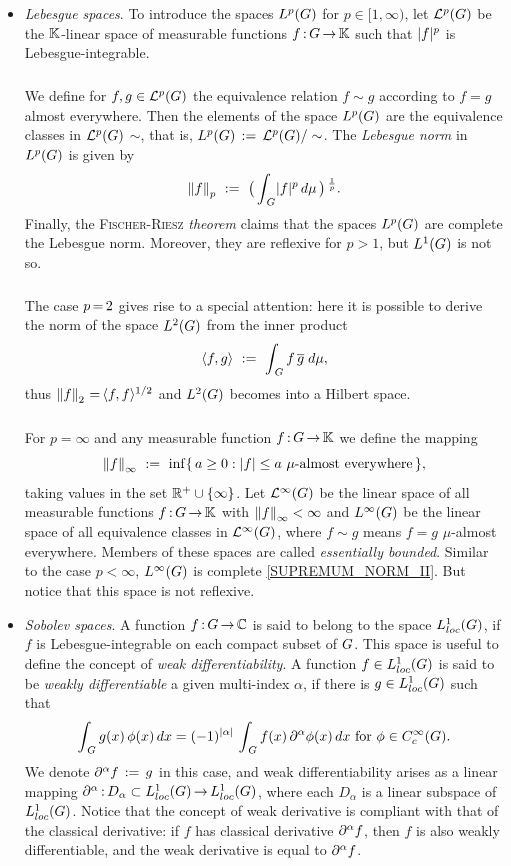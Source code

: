 \documentclass[11pt,twoside]{article}
\begin{document}
\begin{itemize}[leftmargin=15pt,itemsep=6pt]
\item[5.] \textit{Lebesgue spaces}.
To introduce the spaces $L^p(G)$ for $p \in [1,\infty)$,
let ${\mathcal{L}}^p(G)$ be the ${\mathbb{K}}$-linear space of measurable functions
$f{\,:\,}G {\,\to\,} {\mathbb{K}}$
such that $\abs{f} ^p$ is Lebesgue-integrable.

\subparagraph*{}
We define for $f,g \in {\mathcal{L}}^p(G)$ the equivalence relation
$f \sim g$ according to $f=g$ almost everywhere.
Then the elements of the space $L^p(G)$
are the equivalence classes in ${\mathcal{L}}^p(G)$ {\wrt} $\sim$,
that is,
$L^p(G) \,:=\, {\mathcal{L}}^p(G) / \sim$.
The \textit{Lebesgue norm} in $L^p(G)$ is given by
\[
\norm{f}_p
\, \eqdef \,
\big( \int_{\,\G} \abs{f} ^p \, d\mu \,\big) \, ^{\frac{1}{p}}.
\]
Finally,
the \textsc{Fischer-Riesz} \textit{theorem} claims
that the spaces $L^p(G)$ are complete {\wrt} the Lebesgue norm.
Moreover,
they are reflexive for $p >1$,
but $L^1(G)$ is not so.

\subparagraph*{} %
The case $p {\,=\,} 2$ gives rise to a special attention:
here it is possible to derive the norm of the space $L^2(G)$
from the inner product
\[
\langle f,g \rangle \, \,:=\, \, \int_{\,G} f \, \overline{g} \; d\mu,
\]
thus $\left\lVert f \right\rVert_2 {\,=\,} \langle f,f \rangle ^{1/2}$
and $L^2(G)$ becomes into a Hilbert space.

\subparagraph*{}
For $p=\infty$ and any measurable function $f{\,:\,}G {\,\to\,} {\mathbb{K}}$ we define the mapping
\begin{equation}\label{SUPREMUM_NORM_II}
\norm{f}_{\infty} \, \eqdef \, \inf
\{\,a \geq 0: \abs{f} \leq a \,\, \mu \mbox{-almost everywhere}\,\},
\end{equation}
taking values in the set ${\mathbb{R}}^+ \cup \{\infty\}$.
Let ${\mathcal{L}}^{\infty}(G)$ be the linear space
of all measurable functions $f{\,:\,}G {\,\to\,} {\mathbb{K}}$
with $\left\lVert f \right\rVert_{\infty} < \infty$
and $L^{\infty}(G)$ be the linear space of all equivalence classes
in ${\mathcal{L}}^{\infty}(G)$,
where $f \sim g$ means $f=g$ $\mu$-almost everywhere.
Members of these spaces are called \textit{essentially bounded}.
Similar to the case $p < \infty$,
$L^{\infty}(G)$ is complete {\wrt} \eqref{SUPREMUM_NORM_II}.
But notice that this space is not reflexive.

\item[6.] \textit{Sobolev spaces}.
A function $f{\,:\,}G {\,\to\,} {\mathbb{C}}$ is said to belong to the space $L_{loc}^1(G)$,
if $f$ is Lebesgue-integrable on each compact subset of $G$.
This space is useful to define the concept of \textit{weak differentiability}.
A function $f \in L_{loc}^1(G)$ is said to be \textit{weakly differentiable}
{\wrt} a given multi-index $\alpha$,
if there is $g \in L_{loc}^1(G)$
such that 
\[
\int_{\,\G} g(x) \, \phi(x) \, dx
=
(-1)^{ \abs{\alpha} } \,
\int_{\,\G} f(x) \, \PA \phi(x) \, dx
\for \phi \in \TF.
\]
We denote $\partial^{\alpha} f \,:=\, g$ in this case,
and weak differentiability arises as a linear mapping
$\partial^{\alpha}{\,:\,}D_{\alpha} \subset L_{loc}^1(G) {\,\to\,} L_{loc}^1(G)$,
where each $D_{\alpha}$ is a linear subspace of $L_{loc}^1(G)$.
Notice that
the concept of weak derivative is compliant
with that of the classical derivative:
if $f$ has classical derivative $\partial^{\alpha} f$,
then $f$ is also weakly differentiable,
and the weak derivative is equal to $\partial^{\alpha} f$.


\end{itemize}
\end{document}
